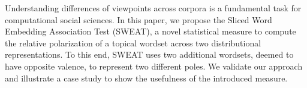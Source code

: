 Understanding differences of viewpoints across corpora is a fundamental task for computational social sciences. In this paper, we propose the Sliced Word Embedding Association Test (SWEAT), a novel statistical measure to compute the relative polarization of a topical wordset across two distributional representations. To this end, SWEAT uses two additional wordsets, deemed to have opposite valence, to represent two different poles. We validate our approach and illustrate a case study to show the usefulness of the introduced measure.
